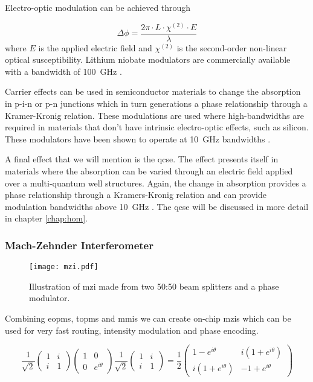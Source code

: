 Electro-optic modulation can be achieved through 

\begin{equation}
	\Delta\phi = \frac{2\pi\cdot L\cdot  \chi^{(2)}\cdot E}{\lambda}
\end{equation}
where $E$ is the applied electric field and $\chi^{(2)}$ is the second-order non-linear optical susceptibility. Lithium niobate modulators are commercially available with a bandwidth of \SI{100}{GHz} \cite{Louay2001Advances}.

Carrier effects can be used in semiconductor materials to change the absorption in p-i-n or p-n junctions which in turn generations a phase relationship through a Kramer-Kronig relation. These modulations are used where high-bandwidths are required in materials that don't have intrinsic electro-optic effects, such as silicon. These modulators have been shown to operate at \SI{10}{GHz} bandwidths \cite{Sibson2017Si}.

A final effect that we will mention is the \ac{qcse}. The effect presents itself in materials where the absorption can be varied through an electric field applied over a multi-quantum well structures. Again, the change in absorption provides a phase relationship through a Kramers-Kronig relation and can provide modulation bandwidths above \SI{10}{GHz} \cite{Sibson2017InP, semenenko2019integrated, semenenko2019mdi, semenenko2019, smit2014}. The \ac{qcse} will be discussed in more detail in chapter \ref{chap:hom}.

\subsubsection*{Mach-Zehnder Interferometer}

\begin{figure}[t]
	\centering
	\texttt{[image: mzi.pdf]}
	\caption[Mach-Zehnder interferometer schematic]{Illustration of \acs{mzi} made from two 50:50 beam splitters and a phase modulator.}
	\label{fig:mzi}
\end{figure}

Combining \acp{eopm}, \acp{topm} and \acp{mmi} we can create on-chip \acp{mzi} which can be used for very fast routing, intensity modulation and phase encoding. 

\begin{equation}
	\frac{1}{\sqrt{2}}\left(
	\begin{matrix}
	1 & i\\
	i & 1
	\end{matrix}
	\right)
	\left(
	\begin{matrix}
	1 & 0\\
	0 & e^{i\theta}
	\end{matrix}
	\right)
	\frac{1}{\sqrt{2}}\left(
	\begin{matrix}
	1 & i\\
	i & 1
	\end{matrix}
	\right)=
	\frac{1}{2}\left(
	\begin{matrix}
	1 - e^{i\theta} & i(1 +  e^{i\theta})\\
	i(1 +  e^{i\theta}) & -1 +  e^{i\theta}
	\end{matrix}
	\right)
\end{equation}

